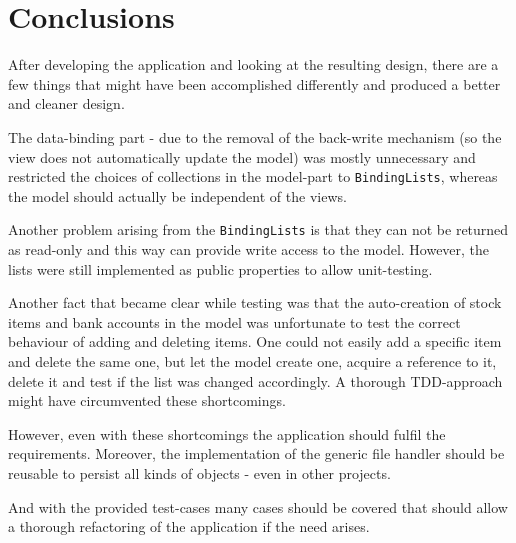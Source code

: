\chapter{Conclusions}\label{ch:conclusions} %

After developing the application and looking at the resulting design, there are a few things that might have been accomplished differently and produced a better and cleaner design.

The data-binding part - due to the removal of the back-write mechanism (so the view does not automatically update the model) was mostly unnecessary and restricted the choices of collections in the model-part to \texttt{BindingLists}, whereas the model should actually be independent of the views.

Another problem arising from the \texttt{BindingLists} is that they can not be returned as read-only and this way can provide write access to the model. However, the lists were still implemented as public properties to allow unit-testing.

Another fact that became clear while testing was that the auto-creation of stock items and bank accounts in the model was unfortunate to test the correct behaviour of adding and deleting items. One could not easily add a specific item and delete the same one, but let the model create one, acquire a reference to it, delete it and test if the list was changed accordingly. A thorough \ac{TDD}-approach might have circumvented these shortcomings.

However, even with these shortcomings the application should fulfil the requirements.
Moreover, the implementation of the generic file handler should be reusable to persist all kinds of objects - even in other projects.

And with the provided test-cases many cases should be covered that should allow a thorough refactoring of the application if the need arises.